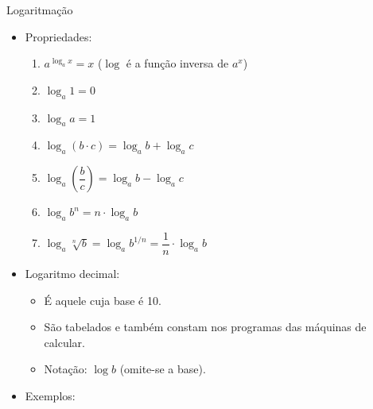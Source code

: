 \documentclass[14pt, aspectratio=169]{beamer}
\newcommand{\skipframe}{\vspace{10.0cm}}
\begin{document}
\begin{frame}[allowframebreaks]{Logaritmação}
\begin{itemize}
\begin{enumerate}[a]

        \skipframe
        \end{enumerate}

    \item Propriedades:

        \begin{enumerate}[a]
            \item $a^{\log_a x} = x$ ($\log$ é a função inversa de $a^x$) 
            \item $\log_a 1 = 0$
            \item $\log_a a = 1$

            \skipframe
            
            \item $\log_a (b \cdot c) = \log_a b + \log_a c$
            \item $\log_a \left( \dfrac{b}{c} \right) = \log_a b - \log_a c$
            \item $\log_a b^n = n \cdot \log_a b$
            \item $\log_a \sqrt[n]{b} = \log_a b^{1/n} = \dfrac{1}{n} \cdot \log_a b$
        \end{enumerate}

        \skipframe
             
        \item Logaritmo decimal:

        \begin{itemize}
            \item É aquele cuja base é 10.
            \item São tabelados e também constam nos programas das máquinas de calcular.
            \item Notação: $\log b$ (omite-se a base).
        \end{itemize}

        \skipframe

        \item Exemplos:


\end{itemize}
\end{frame}
\end{document}

